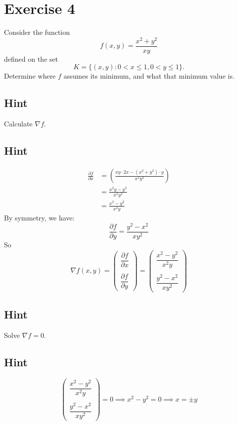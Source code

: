 \documentclass[a4paper,10pt]{article}
\begin{document}
\clearpage

\section{Exercise 4}

Consider the function
\[
    f(x,y) = \frac{x^2 + y^2}{xy}
\]
defined on the set
\[
    K = \{(x,y): 0 < x \leq 1, 0 < y \leq 1\}.
\]
Determine where $f$ assumes its minimum, and what that minimum value is.

\subsection{Hint}
Calculate $\nabla f$.

\subsection{Hint}
\begin{align*}
    \frac{\partial f}{\partial x} & = \left(\frac{xy\cdot 2x - (x^2+y^2)\cdot y}{x^2y^2}\right) \\
                                  & = \frac{x^2y - y^3}{x^2y^2}                                 \\
                                  & = \frac{x^2 - y^2}{x^2y}
\end{align*}
By symmetry, we have:
\[
    \frac{\partial f}{\partial y} = \frac{y^2 - x^2}{xy^2}
\]
So
\[
    \nabla f(x,y) = \begin{pmatrix}
        \dfrac{\partial f}{\partial x} \\ \\ \dfrac{\partial f}{\partial y}
    \end{pmatrix} = \begin{pmatrix}
        \dfrac{x^2 - y^2}{x^2y} \\ \\ \dfrac{y^2 - x^2}{xy^2}
    \end{pmatrix}
\]

\subsection{Hint}
Solve $\nabla f = 0$.

\subsection{Hint}
\[
    \begin{pmatrix}
        \dfrac{x^2 - y^2}{x^2y} \\ \\ \dfrac{y^2 - x^2}{xy^2}
    \end{pmatrix} = 0 \implies x^2 - y^2 = 0 \implies x = \pm y
\]
\end{document}
